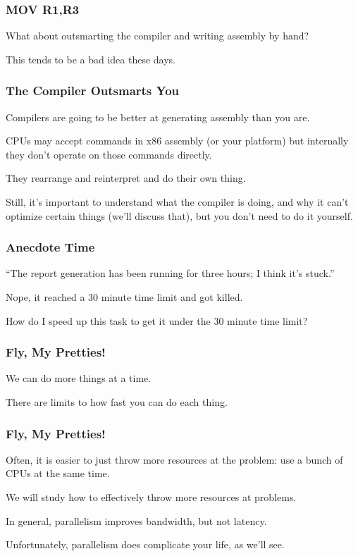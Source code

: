 \begin{frame}
\frametitle{MOV R1,R3}

\Large
What about outsmarting the compiler and writing assembly by hand? 

This tends to be a bad idea these days. 
\end{frame}

\begin{frame}
\frametitle{The Compiler Outsmarts You}

\Large
Compilers are going to be better at generating assembly than you are. 

CPUs may accept commands in x86 assembly (or your platform) but internally they don't operate on those commands directly. 

They rearrange and reinterpret and do their own thing. 

Still, it's important to understand what the compiler is doing, and why it can't optimize certain things (we'll discuss that), but you don't need to do it yourself.

\end{frame}



\begin{frame}
\frametitle{Anecdote Time}
\Large

``The report generation has been running for three hours; I think it's stuck.''

Nope, it reached a 30 minute time limit and got killed. 

How do I speed up this task to get it under the 30 minute time limit?

\end{frame}



\begin{frame}
\frametitle{Fly, My Pretties!}
\Large 
We can do more things at a time.

There are limits to how fast
you can do each thing. 
\end{frame}

\begin{frame}
\frametitle{Fly, My Pretties!}
\Large 
Often, it is easier to just throw more
resources at the problem: use a bunch of CPUs at the same time.

 We
will study how to effectively throw more resources at problems.

In general, parallelism improves bandwidth, but not latency.

Unfortunately, parallelism does complicate your life, as we'll see.



\end{frame}




